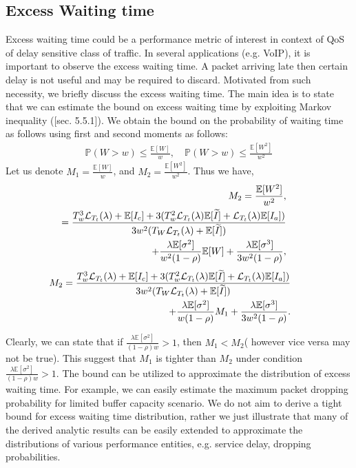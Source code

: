 \documentclass[journal]{IEEEtran}
\newcommand {\bear} {\begin{eqnarray}}
\newcommand {\eear} {\end{eqnarray}}
\newcommand {\bears} {\begin{eqnarray*}}
\newcommand {\eears} {\end{eqnarray*}}
\def \E{{\mathbb E}}
\def \P{{\mathbb P}}
\begin{document}
\subsection{ Excess Waiting time }
\label{sec:a_excess}
Excess waiting time could be a performance metric of interest in context of QoS of delay sensitive class of traffic. In several applications (e.g. VoIP), it is important to observe the excess waiting time. A packet arriving late then certain delay is not useful and may be required to discard. Motivated from such necessity, we briefly discuss the excess waiting time. The main idea is to state that we can estimate the bound on excess waiting time by exploiting Markov inequality (\cite{nelson}[sec. 5.5.1]). We obtain the bound on the probability of waiting time as follows using first and second moments as follows:
\bears
\P(W>w)\leq \frac{\E[W]}{w}, \quad \P(W>w)\leq \frac{\E[W^2]}{w^2}
\eears
Let us denote $M_1=\frac{\E[W]}{w}$, and $M_2=\frac{\E[W^2]}{w^2}$.
Thus we have,
\bear
\nonumber &&\hspace{-7mm}M_2=\frac{\E[W^2]}{w^2},\\
&&\hspace{-7mm}=\frac{ T_w^3 {\cal L}_{T_t}(\lambda)+\E[I_c]+3 (T_w^2{\cal L}_{T_t}(\lambda)\E[\widetilde{I}] +{\cal L}_{T_t}(\lambda) \E[I_a])}{3w^2(T_W{\cal L}_{T_t}(\lambda)+\E[\widetilde{I}])}\nonumber\\
&&\hspace{-7mm}+
\frac{\lambda \E[\sigma^{2}]}{w^2(1-\rho)}\E[W] +\frac{\lambda \E[\sigma^{3}]}{3w^2(1-\rho)},\eear
\bear
&&\hspace{-10mm}M_2=\frac{ T_w^3 {\cal L}_{T_t}(\lambda)+\E[I_c]+3 (T_w^2{\cal L}_{T_t}(\lambda)\E[\widetilde{I}] +{\cal L}_{T_t}(\lambda) \E[I_a])}{3w^2(T_W{\cal L}_{T_t}(\lambda)+ \E[\widetilde{I}])}\nonumber\\
&&\hspace{-7mm}+
\frac{\lambda \E[\sigma^{2}]}{w(1-\rho)}M_1 +\frac{\lambda \E[\sigma^{3}]}{3w^2(1-\rho)}.
\eear

Clearly, we can state that if $\frac{\lambda \E[\sigma^2]}{(1-\rho)w}>1$, then $M_1<M_2$( however vice versa may not be true). This suggest that $M_1$ is tighter than $M_2$ under condition $\frac{\lambda
\E[\sigma^2]}{(1-\rho)w}>1$. 
The bound can be utilized to approximate the distribution of excess waiting time. For example, we can easily estimate the maximum packet dropping probability for limited buffer capacity scenario. We do not aim to derive a tight bound for excess waiting time distribution, rather we just illustrate that 
many of the derived analytic results can be easily extended to approximate the distributions of various performance entities, e.g. service delay, dropping probabilities. 
\end{document}
